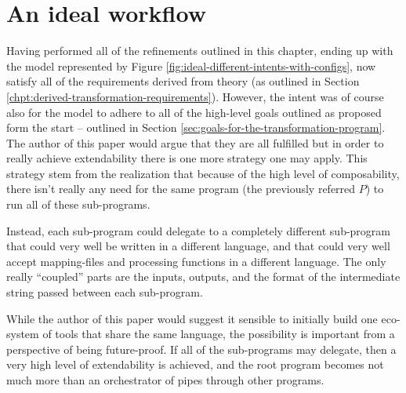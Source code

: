 \documentclass{scrreprt}
\begin{document}
\section{An ideal workflow}
Having performed all of the refinements outlined in this chapter, ending up with the model represented by Figure \ref{fig:ideal-different-intents-with-configs}, now satisfy all of the requirements derived from theory (as outlined in Section \ref{chpt:derived-transformation-requirements}). However, the intent was of course also for the model to adhere to all of the high-level goals outlined as proposed form the start -- outlined in Section \ref{sec:goals-for-the-transformation-program}. The author of this paper would argue that they are all fulfilled but in order to really achieve extendability there is one more strategy one may apply. This strategy stem from the realization that because of the high level of composability, there isn't really any need for the same program (the previously referred $P$) to run all of these sub-programs.

Instead, each sub-program could delegate to a completely different sub-program that could very well be written in a different language, and that could very well accept mapping-files and processing functions in a different language. The only really ``coupled'' parts are the inputs, outputs, and the format of the intermediate string passed between each sub-program.

While the author of this paper would suggest it sensible to initially build one eco-system of tools that share the same language, the possibility is important from a perspective of being future-proof. If all of the sub-programs may delegate, then a very high level of extendability is achieved, and the root program becomes not much more than an orchestrator of pipes through other programs.
\end{document}
